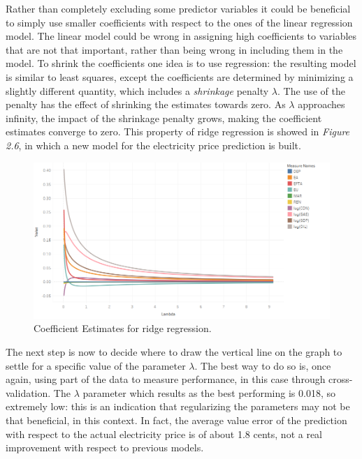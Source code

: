 \documentclass{book}
\begin{document}
Rather than completely excluding some predictor variables it could be beneficial to simply use smaller coefficients with respect to the ones of the linear regression model. The linear model could be wrong in assigning high coefficients to variables that are not that important, rather than being wrong in including them in the model. To shrink the coefficients one idea is to use  regression: the resulting model is similar to least squares, except the coefficients are determined by minimizing a slightly different quantity, which includes a \textit{shrinkage} penalty $\lambda$. The use of the penalty has the effect of shrinking the estimates towards zero. As $\lambda$ approaches infinity, the impact of the shrinkage penalty grows, making the coefficient estimates converge to zero. \cite{james2013introduction} This property of ridge regression is showed in \textit{Figure 2.6}, in which a new model for the electricity price prediction is built.

\bigskip
\begin{figure}[H]
\begin{center}
\captionsetup{justification=centering}
\includegraphics[width=1\textwidth]{Images/ridge.png}
\caption{Coefficient Estimates for ridge regression.}
\end{center}
\end{figure}
\bigskip

The next step is now to decide where to draw the vertical line on the graph to settle for a specific value of the parameter $\lambda$. The best way to do so is, once again, using part of the data to measure performance, in this case through cross-validation. The $\lambda$ parameter which results as the best performing is 0.018, so extremely low: this is an indication that regularizing the parameters may not be that beneficial, in this context. In fact, the average value error of the prediction with respect to the actual electricity price is of about 1.8 cents, not a real improvement with respect to previous models.
\end{document}
